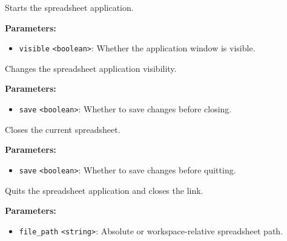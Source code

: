 \documentclass[12pt,a4paper]{article}
\begin{document}
\noindent Starts the spreadsheet application.

\vspace{5mm}
\noindent {}


\noindent \textbf{Parameters:}
\begin{itemize}
  \item \texttt{visible} \texttt{<boolean>}: Whether the application window is visible.
\end{itemize}

\noindent Changes the spreadsheet application visibility.

\vspace{5mm}
\noindent {}


\noindent \textbf{Parameters:}
\begin{itemize}
  \item \texttt{save} \texttt{<boolean>}: Whether to save changes before closing.
\end{itemize}

\noindent Closes the current spreadsheet.

\vspace{5mm}
\noindent {}


\noindent \textbf{Parameters:}
\begin{itemize}
  \item \texttt{save} \texttt{<boolean>}: Whether to save changes before quitting.
\end{itemize}

\noindent Quits the spreadsheet application and closes the link.

\vspace{5mm}
\noindent {}


\noindent \textbf{Parameters:}
\begin{itemize}
  \item \texttt{file\_path} \texttt{<string>}: Absolute or workspace-relative spreadsheet path.
\end{itemize}
\end{document}
